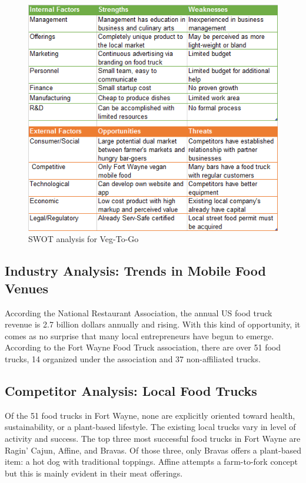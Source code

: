 \documentclass[12pt, letterpaper]{article}
\newcommand{\companyname}{Veg-To-Go}
\begin{document}
\begin{figure}[H]
	\label{SWOT}
	\caption{SWOT analysis for \companyname{}}
	\centering
	\includegraphics{SWOT}
\end{figure}

\subsection{Industry Analysis: Trends in Mobile Food Venues}
According the National Restaurant Association, the annual US food truck revenue is 2.7 billion dollars annually and rising. \cite{ibis1} With this kind of opportunity, it comes as no surprise that many local entrepreneurs have begun to emerge. According to the Fort Wayne Food Truck association, there are over 51 food trucks, 14 organized under the association and 37 non-affiliated trucks. \cite{fwfta}

\subsection{Competitor Analysis: Local Food Trucks}
Of the 51 food trucks in Fort Wayne, none are explicitly oriented toward health, sustainability, or a plant-based lifestyle. \cite{fwfta2} The existing local trucks vary in level of activity and success.  The top three most successful food trucks in Fort Wayne are Ragin' Cajun, Affine, and Bravas. \cite{fwfta2} Of those three, only Bravas offers a plant-based item: a hot dog with traditional toppings.  Affine attempts a farm-to-fork concept but this is mainly evident in their meat offerings.
\end{document}
